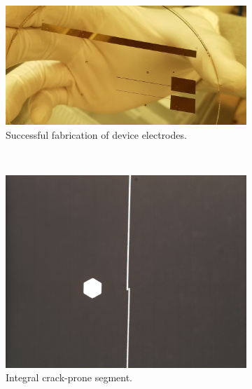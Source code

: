 \begin{figure}[h]
    \begin{subfigure}[b]{\textwidth}
        \centering
        \includegraphics[width=\textwidth]{images/electrodes_real.jpg}
        \caption{Successful fabrication of device electrodes.}
    \end{subfigure}
    \\
    \vspace{0.1 in}
    \centering
    \begin{subfigure}[b]{0.45\textwidth}
        \centering
        \includegraphics[width=\textwidth]{images/goodElectrode.png}
        \caption{Integral crack-prone segment.}
    \end{subfigure}
    \hfill
    \begin{subfigure}[b]{0.45\textwidth}
        \centering

\end{subfigure}
\end{figure}
